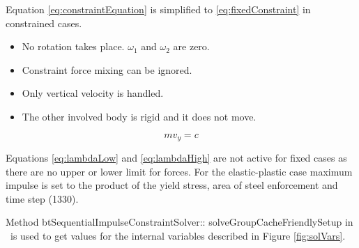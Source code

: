 Equation \ref{eq:constraintEquation} is simplified
to \ref{eq:fixedConstraint} in constrained cases.
\begin{itemize}
\item No rotation takes place. $\omega_1$ and $\omega_2$ are zero.
\item Constraint force mixing can be ignored.
\item Only vertical velocity is handled.
\item The other involved body is rigid and it does not move.
\end{itemize} 

\begin{equation} \label{eq:fixedConstraint}
m v_y = c 
\end{equation}

Equations \ref{eq:lambdaLow} and \ref{eq:lambdaHigh} are not active for fixed cases as
there are no upper or lower limit for forces.
For the elastic-plastic case maximum impulse is set to the product of the yield stress, 
area of steel enforcement and time step (1330).

Method \mbox{btSequentialImpulseConstraintSolver::} \mbox{solveGroupCacheFriendlySetup}
in \cbullet\ is used to get values for the internal variables described in Figure \ref{fig:solVars}. 

